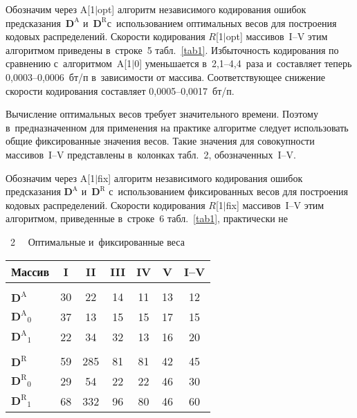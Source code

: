 \begin{multicols}{2}
Обозначим через A[1$\vert$opt] алгоритм независимого кодирования ошибок предсказания~$\mathbf{D}^\text{A}$
и~$\mathbf{D}^\text{R}$\linebreak с~использованием оптимальных весов для по\-строения 
 кодовых распределений. Скорости кодирования $R$[1$\vert$opt] массивов~I--V этим алгоритмом \mbox{приведены} 
 в~строке~5 табл.~\ref{tab1}. Избыточность кодирования по сравнению с~алгоритмом~A[1$\vert$0] уменьшается 
 в~2,1--4,4~раза и~составляет теперь 0,0003--0,0006~бт/п в~зависимости от массива. 
 \mbox{Соответствующее} снижение скорости кодирования составляет 0,0005--0,0017~бт/п.

Вычисление оптимальных весов требует значительного времени. Поэтому 
в~предназначенном для применения на практике алгоритме следует использовать 
общие фиксированные значения весов. Такие значения для совокупности массивов~I--V 
представлены в~колонках табл.~2, обозначенных~\mbox{I--V}.

Обозначим через A[1$\vert$fix] алгоритм независимого кодирования ошибок 
предсказания $\mathbf{D}^\text{A}$ и~$\mathbf{D}^\text{R}$ с~использованием 
фиксированных весов для построения кодовых распределений. Скорости кодирования $R$[1$\vert$fix] 
массивов~I--V этим алгоритмом, приведенные в~строке~6 табл.~\ref{tab1}, 
практически не\linebreak\vspace*{-12pt}



\begin{center}

{{\tablename~2}\ \ \small{
Оптимальные и~фиксированные веса
}}

\vspace{2ex}

{\small \tabcolsep=7.5pt
\begin{tabular}{|l|ccccc|c|}
\hline
\multicolumn{1}{|c|}{Массив}& I     & II    
& III   & IV    & V     & I--V  \\
\hline
&&&&&&\\[-9pt]
\hspace*{3mm}$\mathbf{D}^\text{A}$       &30 &22 &14 &11 &13 &12 \\
\hspace*{3mm}${\mathbf{D}^\text{A}}_0$     &37 &13 &15 &15 &17&15\\
\hspace*{3mm}${\mathbf{D}^\text{A}}_1$     &22 &34 &32 &13 &16 &20\\  
\hline
&&&&&&\\[-9pt]
\hspace*{3mm}$\mathbf{D}^\text{R}$      &59 &285    &81 &81 &42 &45  \\
\hspace*{3mm}${\mathbf{D}^\text{R}}_0$    &29 &\hphantom{1}54 &22 &22 &46 &30  \\
\hspace*{3mm}${\mathbf{D}^\text{R}}_1$    &68 &332    &96 &80 &46 &60  \\
\hline
\end{tabular}
}
\end{center}


\end{multicols}
